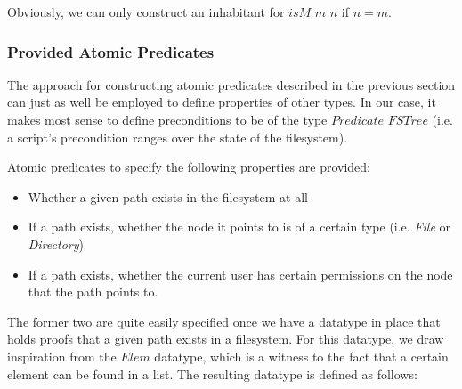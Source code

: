\documentclass[11pt,a4paper]{article}
\begin{document}
Obviously, we can only construct an inhabitant for $isM$ $m$ $n$ if $n = m$. 

\subsubsection{Provided Atomic Predicates}

The approach for constructing atomic predicates described in the previous section can just as well be employed to define properties of other types. In our case, it makes most sense to define preconditions to be of the type $Predicate$ $FSTree$ (i.e. a script's precondition ranges over the state of the filesystem).  

Atomic predicates to specify the following properties are provided: 

\begin{itemize}
\item 
Whether a given path exists in the filesystem at all 

\item
If a path exists, whether the node it points to is of a certain type (i.e. \textit{File} or \textit{Directory}) 

\item 
If a path exists, whether the current user has certain permissions on the node that the path points to. 
\end{itemize}

The former two are quite easily specified once we have a datatype in place that holds proofs that a given path exists in a filesystem. For this datatype, we draw inspiration from the $Elem$ datatype, which is a witness to the fact that a certain element can be found in a list. The resulting datatype is defined as follows: 
\end{document}
